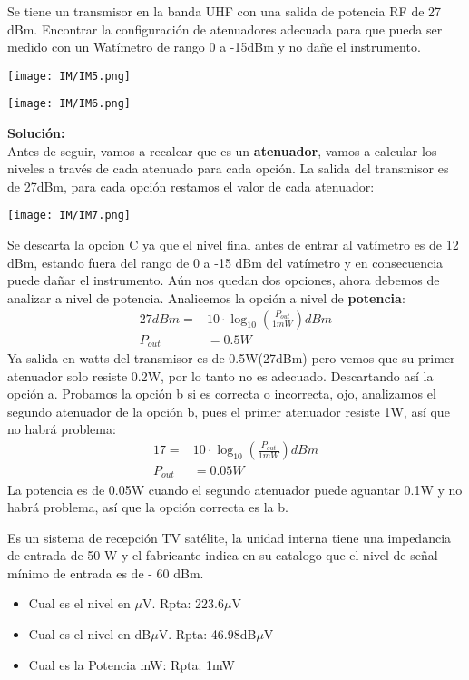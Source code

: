 \documentclass[
	12pt, %
	fleqn, %
	a4paper, %
]{LegrandOrangeBook}
\begin{document}
\begin{example}[Atenuadores]
Se tiene un transmisor en la banda UHF con una salida de potencia RF de 27 dBm. Encontrar la configuración de atenuadores adecuada para que
pueda ser medido con un Watímetro de rango 0 a -15dBm y no dañe el instrumento.\\
\begin{center}
\texttt{[image: IM/IM5.png]}
\end{center}
\begin{center}
\texttt{[image: IM/IM6.png]}
\end{center}
\textbf{Solución:}\\
Antes de seguir, vamos a recalcar que es un \textbf{atenuador}, vamos a calcular los niveles a través de cada atenuado para cada opción. La salida del transmisor es de 27dBm, para cada opción restamos el valor de cada atenuador:
\begin{center}
\texttt{[image: IM/IM7.png]}
\end{center}
Se descarta la opcion C ya que el nivel final antes de entrar al vatímetro es de 12 dBm, estando fuera del rango de 0 a -15 dBm del vatímetro y en consecuencia puede dañar el instrumento. Aún nos quedan dos opciones, ahora debemos de analizar a nivel de potencia. Analicemos la opción a nivel de \textbf{potencia}:
\begin{align*}
27dBm=&10\cdot \log_{10}\left(\frac{P_{out}}{1mW}\right)dBm\\
P_{out}&=0.5W
\end{align*}
Ya salida en watts del transmisor es de 0.5W(27dBm) pero vemos que su primer atenuador solo resiste 0.2W, por lo tanto no es adecuado. Descartando así la opción a. Probamos la opción b si es correcta o incorrecta, ojo, analizamos el segundo atenuador de la opción b, pues el primer atenuador resiste 1W, así que no habrá problema:
\begin{align*}
17=&10\cdot \log_{10}\left(\frac{P_{out}}{1mW}\right)dBm\\
P_{out}&=0.05W
\end{align*}
La potencia es de 0.05W cuando el segundo atenuador puede aguantar 0.1W y no habrá problema, así que la opción correcta es la b.
\end{example}
\begin{exercise}
Es un sistema de recepción TV satélite, la unidad interna tiene una impedancia de entrada de 50 W y el fabricante indica en su catalogo que
el nivel de señal mínimo de entrada es de - 60 dBm.
\begin{itemize}
\item Cual es el nivel en $\mu$V. Rpta: 223.6$\mu$V
\item Cual es el nivel en dB$\mu$V. Rpta: 46.98dB$\mu$V
\item Cual es la Potencia mW: Rpta: 1mW
\end{itemize}
\end{exercise}
\end{document}
